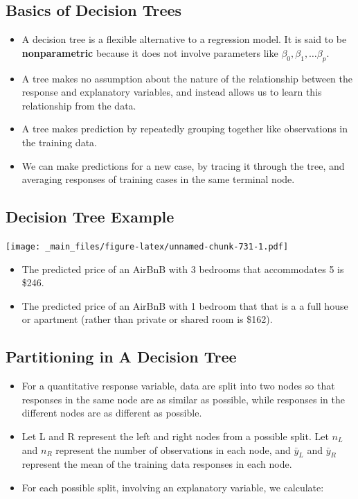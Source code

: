 \documentclass[]{book}
\begin{document}
\subsection{Basics of Decision Trees}\label{basics-of-decision-trees}

\begin{itemize}
\item
  A decision tree is a flexible alternative to a regression model. It is
  said to be \textbf{nonparametric} because it does not involve
  parameters like \(\beta_0, \beta_1, \ldots \beta_p\).
\item
  A tree makes no assumption about the nature of the relationship
  between the response and explanatory variables, and instead allows us
  to learn this relationship from the data.
\item
  A tree makes prediction by repeatedly grouping together like
  observations in the training data.
\item
  We can make predictions for a new case, by tracing it through the
  tree, and averaging responses of training cases in the same terminal
  node.
\end{itemize}

\subsection{Decision Tree Example}\label{decision-tree-example}

\texttt{[image: \_main\_files/figure-latex/unnamed-chunk-731-1.pdf]}

\begin{itemize}
\item
  The predicted price of an AirBnB with 3 bedrooms that accommodates 5
  is \$246.
\item
  The predicted price of an AirBnB with 1 bedroom that that is a a full
  house or apartment (rather than private or shared room is \$162).
\end{itemize}

\subsection{Partitioning in A Decision
Tree}\label{partitioning-in-a-decision-tree}

\begin{itemize}
\item
  For a quantitative response variable, data are split into two nodes so
  that responses in the same node are as similar as possible, while
  responses in the different nodes are as different as possible.
\item
  Let L and R represent the left and right nodes from a possible split.
  Let \(n_L\) and \(n_R\) represent the number of observations in each
  node, and \(\bar{y}_L\) and \(\bar{y}_R\) represent the mean of the
  training data responses in each node.
\item
  For each possible split, involving an explanatory variable, we
  calculate:
\end{itemize}
\end{document}
